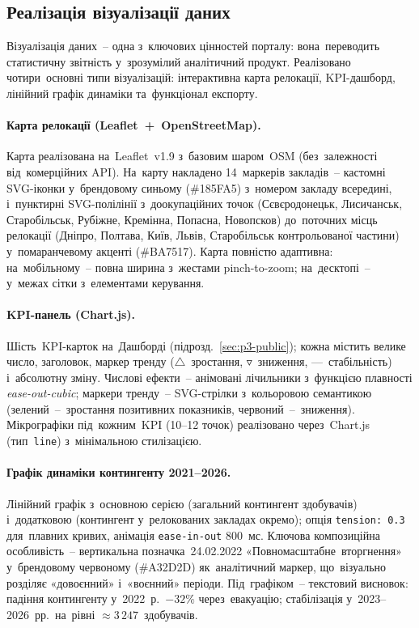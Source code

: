 \subsection{Реалізація візуалізації даних}
\label{sec:p3-viz}

Візуалізація даних~-- одна з~ключових цінностей порталу: вона~переводить статистичну звітність у~зрозумілий аналітичний продукт. Реалізовано чотири~основні типи візуалізацій: інтерактивна карта релокації, KPI-дашборд, лінійний графік динаміки та~функціонал експорту.

\paragraph{Карта релокації (Leaflet~+~OpenStreetMap).} Карта реалізована на~Leaflet~v1.9 з~базовим шаром~OSM (без~залежності від~комерційних API). На~карту накладено 14~маркерів закладів~-- кастомні SVG-іконки у~брендовому синьому (\#185FA5) з~номером закладу всередині, і~пунктирні SVG-полілінії з~доокупаційних точок (Сєвєродонецьк, Лисичанськ, Старобільськ, Рубіжне, Кремінна, Попасна, Новопсков) до~поточних місць релокації (Дніпро, Полтава, Київ, Львів, Старобільськ контрольованої частини) у~помаранчевому акценті (\#BA7517). Карта повністю адаптивна: на~мобільному~-- повна ширина з~жестами pinch-to-zoom; на~десктопі~-- у~межах сітки з~елементами керування.

\paragraph{KPI-панель (Chart.js).} Шість~KPI-карток на~Дашборді (підрозд.~\ref{sec:p3-public}); кожна містить велике число, заголовок, маркер тренду ($\triangle$~зростання, $\triangledown$~зниження, ---~стабільність) і~абсолютну зміну. Числові ефекти~-- анімовані лічильники з~функцією плавності \emph{ease-out-cubic}; маркери тренду~-- SVG-стрілки з~кольоровою семантикою (зелений~--~зростання позитивних показників, червоний~--~зниження). Мікрографіки під~кожним~KPI (10--12 точок) реалізовано через~Chart.js (тип~\texttt{line}) з~мінімальною стилізацією.

\paragraph{Графік динаміки контингенту 2021--2026.} Лінійний графік з~основною серією (загальний контингент здобувачів) і~додатковою (контингент у~релокованих закладах окремо); опція \texttt{tension:~0.3} для~плавних кривих, анімація \texttt{ease-in-out} 800~мс. Ключова композиційна особливість~-- вертикальна позначка~24.02.2022 «Повномасштабне~вторгнення» у~брендовому червоному (\#A32D2D) як~аналітичний маркер, що~візуально розділяє «довоєнний» і~«воєнний» періоди. Під~графіком~-- текстовий висновок: падіння контингенту у~2022~р.~$-32\%$ через~евакуацію; стабілізація у~2023--2026~рр.\ на~рівні $\approx 3\,247$~здобувачів.

